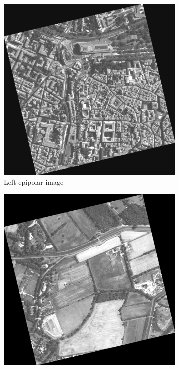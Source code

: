 \begin{figure}[ht!]
    \centering
    \begin{subfigure}[t]{0.4\linewidth}
        \centering
        \includegraphics[width=\linewidth]{Images/Chap_5/img_MTP_120.png}
        \caption{Left epipolar image}
        \label{fig:mtp_img_a}
    \end{subfigure}\hfill
    \begin{subfigure}[t]{0.4\linewidth}
        \centering
        \includegraphics[width=\linewidth]{Images/Chap_5/img_MTP_153.png}

\end{subfigure}
\end{figure}
